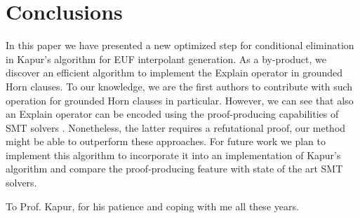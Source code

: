 \documentclass[sigconf,authordraft]{acmart}
\begin{document}
\section{Conclusions}
In this paper we have presented a new optimized step for conditional elimination
in Kapur's algorithm for EUF interpolant generation. As a by-product, we discover
an efficient algorithm to implement the Explain operator in grounded Horn clauses.
To our knowledge, we are the first authors to contribute with such operation for
grounded Horn clauses in particular. However, we can see that also an Explain
operator can be encoded using the proof-producing capabilities of SMT solvers
\cite{10.1007/978-3-540-78800-3_24, 10.5555/2032305.2032319, 10.1007/978-3-642-02959-2_12, articleProofsInSMT, inproceedingsproofsrefutationsz3}. Nonetheless, the latter
requires a refutational proof, our method might be able to outperform these
approaches.
For future work we plan to implement this algorithm to incorporate it into an
implementation of Kapur's algorithm and compare the proof-producing feature
with state of the art SMT solvers.

\begin{acks}
  To Prof. Kapur, for his patience and coping with me all these years.
\end{acks}



\end{document}
